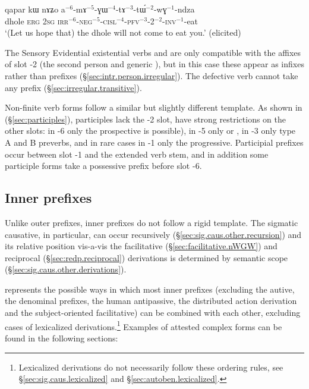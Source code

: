 \begin{exe}
\ex \label{ex:amAGWtAtWwGndza}
\gll qapar kɯ nɤʑo a$^{-6}$-mɤ$^{-5}$-ɣɯ$^{-4}$-tɤ$^{-3}$-tɯ́$^{-2}$-wɣ$^{-1}$-ndza \\
dhole \textsc{erg} \textsc{2sg} \textsc{irr}$^{-6}$-\textsc{neg}$^{-5}$-\textsc{cisl}$^{-4}$-\textsc{pfv}$^{-3}$-2$^{-2}$-\textsc{inv}$^{-1}$-eat \\
\glt `(Let us hope that) the dhole will not come to eat you.' (elicited)
\end{exe}


The Sensory Evidential existential verbs  and  are only compatible with the affixes of slot -2 (the second person and generic ), but in this case these appear as infixes rather than prefixes (§\ref{sec:intr.person.irregular}). The defective verb  cannot take any prefix (§\ref{sec:irregular.transitive}).

Non-finite verb forms follow a similar but slightly different template. As shown in  (§\ref{sec:participles}), participles lack the -2 slot, have strong restrictions on the other slots: in -6 only the prospective  is possible), in -5 only  or , in -3 only type A and B preverbs, and in rare cases in -1 only the progressive. Participial prefixes occur between slot -1 and the extended verb stem, and in addition some participle forms take a possessive prefix before slot -6.

\subsection{Inner prefixes} \label{sec:inner.prefixal.chain}
Unlike outer prefixes, inner prefixes do not follow a rigid template. The sigmatic causative, in particular, can occur recursively (§\ref{sec:sig.caus.other.recursion}) and its relative position vis-a-vis the facilitative (§\ref{sec:facilitative.nWGW}) and reciprocal (§\ref{sec:redp.reciprocal}) derivations is determined by semantic scope (§\ref{sec:sig.caus.other.derivations}).

 represents the possible ways in which most inner prefixes (excluding the autive, the denominal prefixes, the human antipassive, the distributed action derivation and the subject-oriented facilitative) can be combined with each other, excluding cases of lexicalized derivations.\footnote{Lexicalized derivations do not necessarily follow these ordering rules, see §\ref{sec:sig.caus.lexicalized} and §\ref{sec:autoben.lexicalized}.} Examples of attested complex forms can be found in the following sections:

